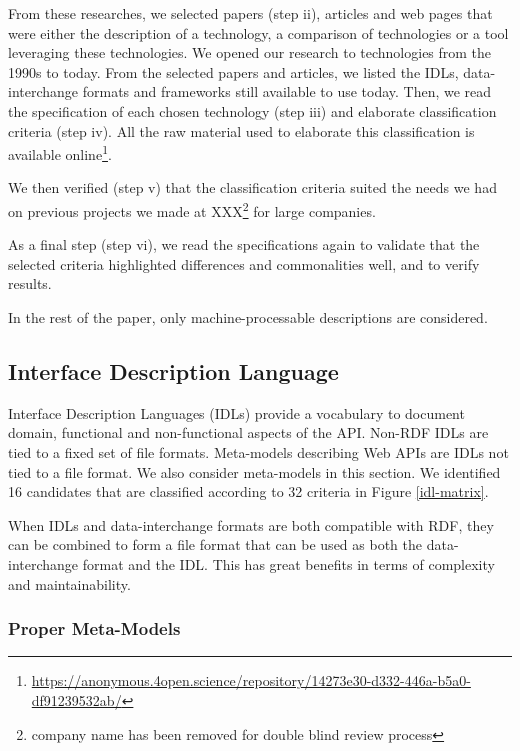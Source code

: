 From these researches, we selected papers (step ii), articles and web pages that were either the description of a technology, a comparison of technologies or a tool leveraging these technologies. We opened our research to technologies from the 1990s to today. 
From the selected papers and articles, we listed the IDLs, data-interchange formats and frameworks still available to use today.
Then, we read the specification of each chosen technology (step iii) and elaborate classification criteria (step iv). All the raw material used to elaborate this classification is available online\footnote{\url{https://anonymous.4open.science/repository/14273e30-d332-446a-b5a0-df91239532ab/}}. 

We then verified (step v) that the classification criteria suited the needs we had on previous projects we made at  XXX\footnote{company name has been removed for double blind review process} for large companies. 

As a final step (step vi), we read the specifications again to validate that the selected criteria highlighted differences and commonalities well, and to verify results.

In the rest of the paper, only machine-processable descriptions are considered.

\subsection{Interface Description Language}


Interface Description Languages (IDLs) provide a vocabulary to document domain, functional and non-functional aspects of the API. Non-RDF IDLs are tied to a fixed set of file formats. Meta-models describing Web APIs are IDLs not tied to a file format. We also consider meta-models in this section. We identified 16 candidates that are classified according to 32 criteria in Figure \ref{idl-matrix}.

When IDLs and data-interchange formats are both compatible with RDF, they can be combined to form a file format that can be used as both the data-interchange format and the IDL. This has great benefits in terms of complexity and maintainability.

\subsubsection{Proper Meta-Models}

